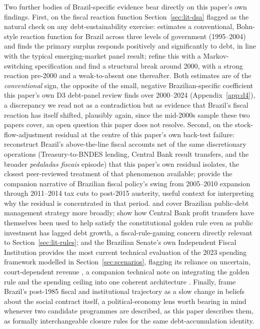 \documentclass[11pt,a4paper]{article}
\begin{document}
Two further bodies of Brazil-specific evidence bear directly on this paper's own findings. First, on the fiscal reaction function Section~\ref{sec:lit-dsa} flagged as the natural check on any debt-sustainability exercise: \citet{demello2008} estimates a conventional, Bohn-style reaction function for Brazil across three levels of government (1995--2004) and finds the primary surplus responds positively and significantly to debt, in line with the typical emerging-market panel result; \citet{mendoncasantossachsida2009} refine this with a Markov-switching specification and find a structural break around 2000, with a strong reaction pre-2000 and a weak-to-absent one thereafter. Both estimates are of the \emph{conventional} sign, the opposite of the small, negative Brazilian-specific coefficient this paper's own D3 debt-panel review finds over 2000--2024 (Appendix~\ref{app:d4}), a discrepancy we read not as a contradiction but as evidence that Brazil's fiscal reaction has itself shifted, plausibly again, since the mid-2000s sample these two papers cover, an open question this paper does not resolve. Second, on the stock-flow-adjustment residual at the centre of this paper's own back-test failure: \citet{gobettiorair2017} reconstruct Brazil's above-the-line fiscal accounts net of the same discretionary operations (Treasury-to-BNDES lending, Central Bank result transfers, and the broader \emph{pedaladas fiscais} episode) that this paper's own residual isolates, the closest peer-reviewed treatment of that phenomenon available; \citet{orairgobetti2017} provide the companion narrative of Brazilian fiscal policy's swing from 2005--2010 expansion through 2011--2014 tax cuts to post-2015 austerity, useful context for interpreting why the residual is concentrated in that period. \citet{bevilaquagarcia2002} and \citet{vivianmendonca2008} cover Brazilian public-debt management strategy more broadly; \citet{nunesetal2020} show how Central Bank profit transfers have themselves been used to help satisfy the constitutional golden rule even as public investment has lagged debt growth, a fiscal-rule-gaming concern directly relevant to Section~\ref{sec:lit-rules}; and the Brazilian Senate's own Independent Fiscal Institution provides the most current technical evaluation of the 2023 spending framework modelled in Section~\ref{sec:scenarios}, flagging its reliance on uncertain, court-dependent revenue \citep{ifi2023raf76}, a companion technical note on integrating the golden rule and the spending ceiling into one coherent architecture \citep{enaptesouro2019}. Finally, \citet{alstonmelomuellerpereira2013} frame Brazil's post-1985 fiscal and institutional trajectory as a slow change in beliefs about the social contract itself, a political-economy lens worth bearing in mind whenever two candidate programmes are described, as this paper describes them, as formally interchangeable closure rules for the same debt-accumulation identity.
\end{document}
